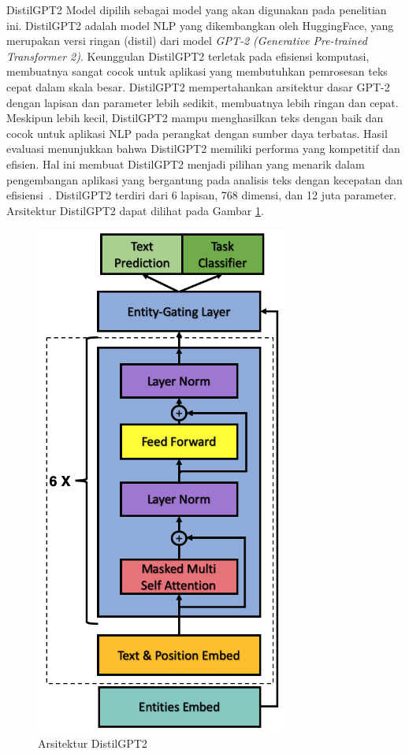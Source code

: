 DistilGPT2 Model dipilih sebagai model yang akan digunakan pada 
penelitian ini. DistilGPT2 adalah model NLP yang dikembangkan oleh 
HuggingFace, yang merupakan versi ringan (distil) dari model 
\emph{GPT-2 (Generative Pre-trained Transformer 2)}. Keunggulan 
DistilGPT2 terletak pada efisiensi komputasi, membuatnya sangat 
cocok untuk aplikasi yang membutuhkan pemrosesan teks cepat dalam 
skala besar. DistilGPT2 mempertahankan arsitektur dasar GPT-2 dengan 
lapisan dan parameter lebih sedikit, membuatnya lebih ringan dan cepat. 
Meskipun lebih kecil, DistilGPT2 mampu menghasilkan teks dengan baik 
dan cocok untuk aplikasi NLP pada perangkat dengan sumber daya 
terbatas. Hasil evaluasi menunjukkan bahwa DistilGPT2 memiliki 
performa yang kompetitif dan efisien. Hal ini membuat DistilGPT2 
menjadi pilihan yang menarik dalam pengembangan aplikasi yang 
bergantung pada analisis teks dengan kecepatan dan efisiensi~\cite{buzea2022}. 
DistilGPT2 terdiri dari 6 lapisan, 768 dimensi, dan 12 juta parameter.
Arsitektur DistilGPT2 dapat dilihat pada Gambar 
\ref{fig:distilgpt2Architecture}.

\begin{figure}[H]
  \centering
  \includegraphics[scale=0.5]{gambar/DistilledGPT2Architecture.png}
  \caption{Arsitektur DistilGPT2}
  \label{fig:distilgpt2Architecture}
\end{figure}


